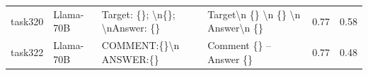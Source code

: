 \begin{longtable}{@{}p{0.8cm\tiny}p{1cm\tiny}p{4.1cm\ttfamily\tiny}p{4.1cm\ttfamily\tiny}p{0.8cm\tiny}p{0.8cm\tiny}@{}}
task320   & Llama-70B  & Target: \{\}; \textbackslash{}n\{\}; \textbackslash{}nAnswer: \{\}                                                                                                                                                                                                                                                                                                                                                                                                                                                      & Target\textbackslash{}n \{\} \textbackslash{}n \{\} \textbackslash{}n Answer\textbackslash{}n \{\}                                                                                                                                                                                                                                                                                                                                                                                                                                                                                & 0.77 & 0.58 \\
task322   & Llama-70B  & COMMENT:\{\}\textbackslash{}n ANSWER:\{\}                                                                                                                                                                                                                                                                                                                                                                                                                                                                               & Comment \{\} -- Answer \{\}                                                                                                                                                                                                                                                                                                                                                                                                                                                                                                                                                       & 0.77 & 0.48 \\

\end{longtable}

